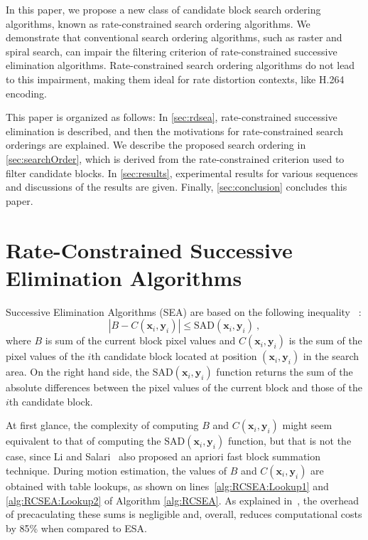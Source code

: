 \documentclass{article}
\newcommand{\beq}{\begin{dmath}}
\newcommand{\eeq}{\end{dmath}}
\newcommand{\SAD}{\text{SAD}}
\newcommand{\vx}{\mathbf{x}}
\newcommand{\vy}{\mathbf{y}}
\begin{document}
In this paper, we propose a new class of candidate block search ordering
algorithms, known as rate-constrained search ordering algorithms. We demonstrate
that conventional search ordering algorithms, such as raster and spiral search, can
impair the filtering criterion of rate-constrained successive elimination algorithms.
Rate-constrained search ordering algorithms do not lead to this impairment, making
them ideal for rate distortion contexts, like H.264 encoding.

This paper is organized as follows: In \autoref{sec:rdsea}, rate-constrained
successive elimination is described, and then the motivations for
rate-constrained search orderings are explained. We describe the proposed search
ordering in \autoref{sec:searchOrder}, which is derived from the
rate-constrained criterion used to filter candidate blocks. In
\autoref{sec:results}, experimental results for various sequences and
discussions of the results are given. Finally, \autoref{sec:conclusion}
concludes this paper.

\vspace{-0.5em}
\section{Rate-Constrained Successive Elimination Algorithms}
\label{sec:rdsea}
\vspace{-0.2em}
Successive Elimination Algorithms (SEA) are based on the following
inequality~\cite{Li1995a}
\vspace{-0.2em}:
\beq
| B - C(\vx_i,\vy_i) | \leqslant \SAD(\vx_i,\vy_i) \:,
\label{eq:SEA}
\eeq 
\vspace{-0.2em}
where $B$ is sum of the current block pixel values and $C(\vx_i,\vy_i)$ is the sum
of the pixel values of the $i$th candidate block located at position $(\vx_i,
\vy_i)$ in the search area. On the right hand side, the $\SAD(\vx_i,\vy_i)$
function returns the sum of the absolute differences between the pixel values of
the current block and those of the $i$th candidate block.

At first glance, the complexity of computing $B$ and $C(\vx_i,\vy_i)$ might seem
equivalent to that of computing the $\SAD(\vx_i,\vy_i)$ function, but that is
not the case, since Li and Salari~\cite{Li1995a} also proposed an apriori fast block
summation technique. During motion estimation, the values of $B$ and
$C(\vx_i,\vy_i)$ are obtained with table lookups, as shown on
lines~\ref{alg:RCSEA:Lookup1} and \ref{alg:RCSEA:Lookup2} of Algorithm
\ref{alg:RCSEA}. As explained in~\cite{Li1995a}, the overhead of
precaculating these sums is negligible and, overall, reduces computational costs
by 85\% when compared to ESA.
\end{document}
